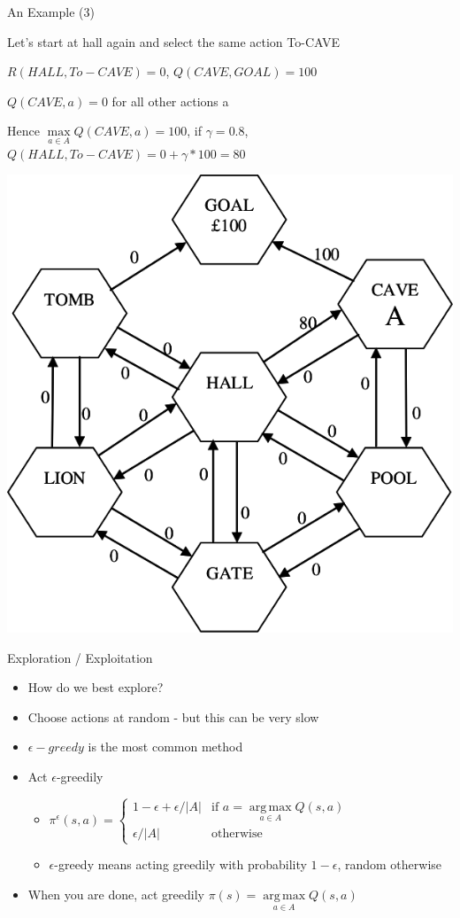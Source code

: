 \documentclass[]{beamer}
\providecommand{\tightlist}{%
  \setlength{\itemsep}{0pt}\setlength{\parskip}{0pt}}
\newcommand{\twopartdefo}[3]
{
  \left\{
    \begin{array}{ll}
      #1 & \mbox{if } #2 \\
      #3 & \mbox{otherwise}
    \end{array}
  \right.
}
\DeclareMathOperator*{\argmax}{arg\,max}
\begin{document}
\begin{frame}{An Example (3)}

Let's start at hall again and select the same action To-CAVE

\(R(HALL, To-CAVE) = 0\), \({Q}(CAVE, GOAL) = 100\)

\({Q}(CAVE,a) = 0\) for all other actions a

Hence \(\max\limits_{a \in A} {Q}(CAVE,a) = 100\), if \(\gamma = 0.8\),
\({Q}(HALL, To-CAVE) = 0 + \gamma * 100 = 80\)

\center
\includegraphics[scale=0.20]{figures/example3.png}

\end{frame}

\begin{frame}{Exploration / Exploitation}

\begin{itemize}
\tightlist
\item
  How do we best explore?
\item
  Choose actions at random - but this can be very slow
\item
  \(\epsilon-greedy\) is the most common method
\item
  Act \(\epsilon\)-greedily

  \begin{itemize}
  \tightlist
  \item
    \(\pi^\epsilon(s,a) = \twopartdefo{ 1-\epsilon + \epsilon/|A| }{ a = \argmax\limits_{a \in A} Q(s,a)}{\epsilon/|A|}\)
  \item
    \(\epsilon\)-greedy means acting greedily with probability
    \(1-\epsilon\), random otherwise
  \end{itemize}
\item
  When you are done, act greedily
  \(\pi(s) = \argmax\limits_{a \in A} Q(s,a)\)
\end{itemize}

\end{frame}
\end{document}

